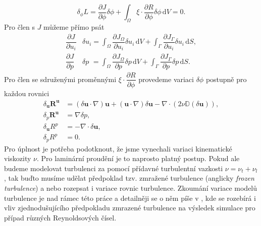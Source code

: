 \begin{equation} \label{eq:sdruzena_variace}
\delta_\phi L = 
\frac{\partial J}{\partial \phi}\delta\phi
+
\int_{\Omega} 
\xi \cdot \dfrac{\partial R}{\partial \phi}  \delta\phi 
\, \mathrm{d}V
 = 0.
\end{equation}
Pro člen s $ J $ můžeme přímo psát
\begin{align}
\dfrac{\partial J}{\partial u_i}& \delta u_i = \int_{\Omega} \dfrac{\partial J_{\Omega}}{\partial u_i} \delta u_i \, \mathrm{d}V + \int_{\Gamma} \dfrac{\partial J_{\Gamma}}{\partial u_i} \delta u_i \, \mathrm{d}S, \\
\dfrac{\partial J}{\partial p} &\delta p \,\,= \int_{\Omega} \dfrac{\partial J_{\Omega}}{\partial p} \delta p  \, \mathrm{d}V + \int_{\Gamma} \dfrac{\partial J_{\Gamma}}{\partial p} \delta p  \, \mathrm{d}S.
\end{align}
Pro člen se sdruženými proměnnými $ \xi \cdot \dfrac{\partial R}{\partial \phi} $ provedeme variaci $ \delta\phi $ postupně pro každou rovnici
\begin{align}
\delta_\mathbf{u} \mathbf{R^u}&=
(\delta \mathbf{u}\cdot \nabla )\mathbf{u} + (\mathbf{u}\cdot \nabla )\delta\mathbf{u} - \nabla \cdot (2\nu \mathbb{D}(\delta \mathbf{u}) ) ,\\
\delta_p \mathbf{R^u}&= \nabla \delta p,\\
\delta_\mathbf{u}R^p &= -\nabla \cdot \delta \mathbf{u} ,\\
\delta_p R^p &= 0.
\end{align}
Pro úplnost je potřeba podotknout, že jsme vynechali variaci kinematické viskozity $ \nu $. 
Pro laminární proudění je to naprosto platný postup. 
Pokud ale budeme modelovat turbulenci za pomocí přídavné turbulentní vazkosti $ \nu = \nu_t + \nu_l $, tak buďto musíme udělat předpoklad tzv. zmražené turbulence (anglicky \textit{frozen turbulence}) a nebo rozepsat i variace rovnic turbulence. Zkoumání variace modelů turbulence je nad rámec této práce a detailněji se o něm píše v \cite{zymaris2009continuous}, kde se rozebírá i vliv zjednodušujícího předpokladu zmrazené turbulence na výsledek simulace pro případ různých Reynoldsových čísel. 

